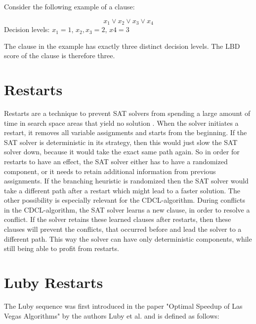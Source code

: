 Consider the following example of a clause:

\begin{leftbar}
\begin{center}
\begin{displaymath}
x_1 \vee x_2 \vee x_3 \vee x_4
\end{displaymath}
Decision levels: $x_1=1$, $x_2,x_3=2$, $x4=3$ 
\end{center}
\end{leftbar}

The clause in the example has exactly three distinct decision levels. The LBD score of the clause is therefore three.

\section{Restarts}

Restarts are a technique to prevent SAT solvers from spending a large amount of time in search space areas that yield no solution \cite{biere2009handbook}. When the solver initiates a restart, it removes all variable assignments and starts from the beginning. If the SAT solver is deterministic in its strategy, then this would just slow the SAT solver down, because it would take the exact same path again. So in order for restarts to have an effect, the SAT solver either has to have a randomized component, or it needs to retain additional information from previous assignments. If the branching heuristic is randomized then the SAT solver would take a different path after a restart which might lead to a faster solution. The other possibility is especially relevant for the CDCL-algorithm. During conflicts in the CDCL-algorithm, the SAT solver learns a new clause, in order to resolve a conflict. If the solver retains these learned clauses after restarts, then these clauses will prevent the conflicts, that occurred before and lead the solver to a different path. This way the solver can have only deterministic components, while still being able to profit from restarts. \cite{biere2009handbook}

\section{Luby Restarts}

The Luby sequence was first introduced in the paper "Optimal Speedup of Las Vegas Algorithms" \cite{luby1993optimal} by the authors Luby et al. and is defined as follows:

